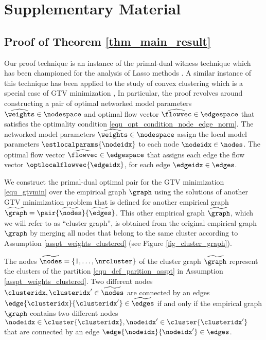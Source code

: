 \documentclass[lettersize,journal]{IEEEtran}
\begin{document}

\section{Supplementary Material}


\subsection{Proof of Theorem \ref{thm_main_result}}
\label{app_proof_main_result} 
Our proof technique is an instance of the primal-dual witness technique which has been championed 
for the analysis of Lasso methods \cite[Sec. 11.4.]{HastieWainwrightBook}. A similar instance of this 
technique has been applied to the study of convex clustering which is a special case of GTV minimization \cite[Theorem 5]{JMLR:v22:18-694}, 
In particular, the proof revolves around constructing a pair of optimal networked model 
parameters $\widehat{\weights} \in \nodespace$ and optimal flow vector $\widehat{\flowvec} \in \edgespace$ 
that satisfies the optimality condition \eqref{equ_opt_condition_node_edge_norm}. 
The networked model parameters $\widehat{\weights} \in \nodespace$ assign the local 
model parameters $\estlocalparams{\nodeidx}$ to each node $\nodeidx \in \nodes$. The 
optimal flow vector $\widehat{\flowvec} \in \edgespace$ that assigns each edge the 
flow vector $\optlocalflowvec{\edgeidx}$, for each edge $\edgeidx \in \edges$. 


We construct the primal-dual optimal pair for the GTV minimization \eqref{equ_gtvmin} over the 
empirical graph $\graph$ using the solutions of another GTV minimization problem that is defined 
for another empirical graph $\widetilde{\graph} = \pair{\widetilde{\nodes}}{\widetilde{\edges}}$. This 
other empirical graph $\widetilde{\graph}$, which we will refer to as ``cluster graph'', is obtained from 
the original empirical graph $\graph$ by merging all nodes that belong to the same cluster according 
to Assumption \ref{asspt_weights_clustered} (see Figure \ref{fig_cluster_graph}).  

The nodes $\widetilde{\nodes} = \{1,\ldots,\nrcluster\}$ of the cluster graph $\widetilde{\graph}$ represent 
the clusters of the partition \eqref{equ_def_parition_asspt} in Assumption \ref{asspt_weights_clustered}. 
Two different nodes $\clusteridx,\clusteridx' \in \widetilde{\nodes}$ are connected by an edges $\edge{\clusteridx}{\clusteridx'} \in 
\widetilde{\edges}$ if and only if the empirical graph $\graph$ contains two different nodes 
$\nodeidx \in \cluster{\clusteridx}, \nodeidx' \in \cluster{\clusteridx'}$ that are connected by an 
edge $\edge{\nodeidx}{\nodeidx'} \in \edges$. 
\end{document}
